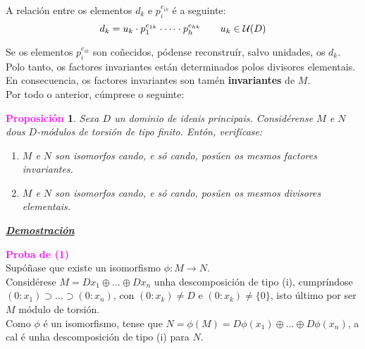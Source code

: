 \documentclass[twoside]{report}
\newcommand{\magbf}[1]{\textcolor{magenta}{\textbf{#1}}} %
\theoremstyle{mystyle}
\newtheorem{prop}{\magbf{Proposición}}[chapter]
\newenvironment{proposition}
{\begin{mdframed}[linecolor = magenta,backgroundcolor = classicrose, linewidth = 2mm]\begin{prop}}
{\end{prop}\end{mdframed}}
\begin{document}
\noindent A relación entre os elementos $d_{k}$ e $p_{i}^{e_{ik}}$ é a seguinte:
$$d_{k} = u_{k} \cdot p_{1}^{e_{1k}} \cdot \dots \cdot p_{h}^{e_{hk}} \hspace{7mm} u_{k} \in \mathcal{U}(D)$$

\noindent Se os elementos $p_{i}^{e_{ik}}$ son coñecidos, pódense reconstruír, salvo unidades, os $d_{k}$. Polo tanto, os factores invariantes están determinados polos divisores elementais.\\

\noindent En consecuencia, os factores invariantes son tamén \textbf{invariantes} de $M$.\\

\noindent Por todo o anterior, cúmprese o seguinte:\\

\renewcommand{\theenumi}{\arabic{enumi}}
\renewcommand{\labelenumi}{\theenumi.}

\begin{proposition} \label{prop4.2}
Sexa $D$ un dominio de ideais principais. Considérense $M$ e $N$ dous $D$-módulos de torsión de tipo finito. Entón, verifícase:
\begin{enumerate}
    \item $M$ e $N$ son isomorfos cando, e só cando, posúen os mesmos factores invariantes.
    \item $M$ e $N$ son isomorfos cando, e só cando, posúen os mesmos divisores elementais.
\end{enumerate}
\end{proposition}

\vspace{2mm}

\noindent \textbf{\textit{\underline{Demostración}}}

\vspace{2mm}

\noindent \magbf{Proba de (1)} \\

\noindent {} Supóñase que existe un isomorfismo $\phi: M \longrightarrow N$.\\

\noindent Considérese $M = Dx_{1} \oplus \dots \oplus Dx_{n}$ unha descomposición de tipo (i), cumpríndose $(0 : x_{1}) \supset \dots \supset (0 : x_{n})$, con $(0 : x_{k}) \neq D$ e $(0 : x_{k}) \neq \{0\}$, isto último por ser $M$ módulo de torsión.\\

\noindent Como $\phi$ é un isomorfismo, tense que $N = \phi(M) = D\phi(x_{1}) \oplus \dots \oplus D\phi(x_{n})$, a cal é unha descomposición de tipo (i) para $N$.\\
\end{document}
